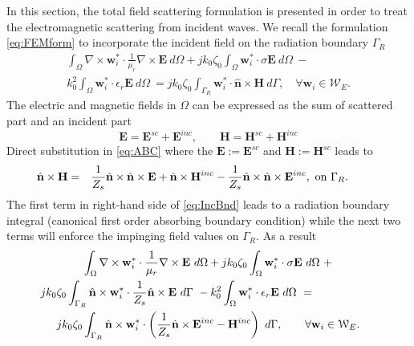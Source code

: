In this section, the total field scattering formulation is presented in order to treat the electromagnetic scattering from incident waves. We recall the formulation \eqref{eq:FEMform} to incorporate the incident field on the radiation boundary $\Gamma_R$
\begin{multline}
\label{eq:FEMformScatt1}
\int_\Omega \nabla \times \mathbf{w}_i^* \cdot \frac{1}{\mu_r} \nabla \times \mathbf{E} \ d\Omega +
 j k_0 \zeta_0 \int_\Omega \mathbf{w}_i^* \cdot \sigma \mathbf{E} \ d\Omega \ - \\ 
 k_0^2 \int_\Omega \mathbf{w}_i^* \cdot \epsilon_r \mathbf{E} \ d\Omega \ = 
 j k_0 \zeta_0 \int_{\Gamma_{R}} \mathbf{w}_i^* \cdot \hat{\mathbf{n}} \times \mathbf{H} \ d\Gamma, \quad \forall \mathbf{w}_i \in \mathcal{W}_E.
\end{multline}
%
\noindent The electric and magnetic fields in $\Omega$ can be expressed as the sum of scattered part and an incident part
$$\mathbf{E} = \mathbf{E}^{sc} + \mathbf{E}^{inc}, \qquad \mathbf{H} = \mathbf{H}^{sc} + \mathbf{H}^{inc} $$
\noindent Direct substitution in \eqref{eq:ABC} where the $\mathbf{E} := \mathbf{E}^{sc}$ and $\mathbf{H} := \mathbf{H}^{sc}$ leads to
\begin{eqnarray}
\label{eq:IncBnd}
\hspace{-1cm}\hat{\mathbf{n}} \times \mathbf{H} & = & \frac{1}{Z_s} \hat{\mathbf{n}} \times \hat{\mathbf{n}} \times \mathbf{E} + \hat{\mathbf{n}} \times \mathbf{H}^{inc} - \frac{1}{Z_s} \hat{\mathbf{n}} \times \hat{\mathbf{n}} \times \mathbf{E}^{inc}, \ \mathrm{on} \ \Gamma_{R}.
\end{eqnarray}
\noindent The first term in right-hand side of \eqref{eq:IncBnd} leads to a radiation boundary integral (canonical first order absorbing boundary condition) while the next two terms will enforce the impinging field values on $\Gamma_R$. As a result
\begin{multline}
\label{eq:FEMformScatt}
\int_\Omega \nabla \times \mathbf{w}_i^* \cdot \frac{1}{\mu_r} \nabla \times \mathbf{E} \ d\Omega + j k_0 \zeta_0 \int_\Omega \mathbf{w}_i^* \cdot \sigma \mathbf{E} \ d\Omega \ + \\
\hspace{-2cm} j k_0 \zeta_0 \int_{\mathrm{\Gamma}_R} \hat{\mathbf{n}} \times \mathbf{w}_i^* \cdot \frac{1}{Z_s} \hat{\mathbf{n}} \times \mathbf{E} \ d\mathrm{\Gamma} \ - 
 k_0^2 \int_\Omega \mathbf{w}_i^* \cdot \epsilon_r \mathbf{E} \ d\Omega \ = \\
 j k_0 \zeta_0 \int_{\Gamma_{R}} \hat{\mathbf{n}} \times \mathbf{w}_i^* \cdot \left( \frac{1}{Z_s} \hat{\mathbf{n}} \times \mathbf{E}^{inc} - \mathbf{H}^{inc} \right) \ d\Gamma, \qquad \forall \mathbf{w}_i \in \mathcal{W}_E.
\end{multline}

